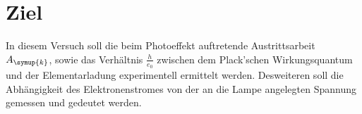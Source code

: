 \section{Ziel}
\label{sec:Ziel}
In diesem Versuch soll die beim Photoeffekt auftretende Austrittsarbeit $A_{\symup{k}}$,
sowie das Verhältnis $\frac{h}{e_0}$ zwischen dem  Plack'schen Wirkungsquantum und
der Elementarladung experimentell ermittelt werden. Desweiteren soll die Abhängigkeit
des Elektronenstromes von der an die Lampe angelegten Spannung gemessen und gedeutet werden.
